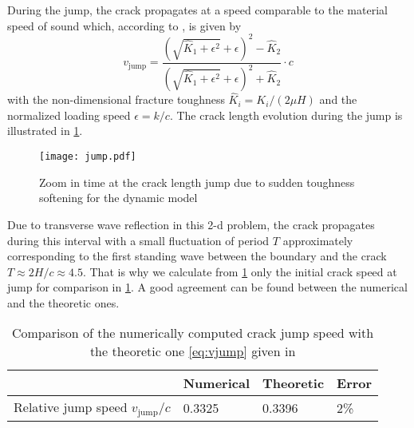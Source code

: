 During the jump, the crack propagates at a speed comparable to the material speed of sound which, according to \cite{DumouchelMarigoCharlotte:2008}, is given by
\begin{equation} \label{eq:vjump}
v_\mathrm{jump}=\frac{\left(\sqrt{\widehat{K}_1+\epsilon^2}+\epsilon\right)^2-\widehat{K}_2}{\left(\sqrt{\widehat{K}_1+\epsilon^2}+\epsilon\right)^2+\widehat{K}_2}\cdot c
\end{equation}
with the non-dimensional fracture toughness $\widehat{K}_i=K_i/(2\mu H)$ and the normalized loading speed $\epsilon=k/c$. The crack length evolution during the jump is illustrated in \cref{fig:softGcqs_jump}.
\begin{figure}[htbp]
\centering
\texttt{[image: jump.pdf]}
\caption{Zoom in time at the crack length jump due to sudden toughness softening for the dynamic model} \label{fig:softGcqs_jump}
\end{figure}
Due to transverse wave reflection in this 2-d problem, the crack propagates during this interval with a small fluctuation of period $T$ approximately corresponding to the first standing wave between the boundary and the crack $T\approx 2H/c\approx 4.5$. That is why we calculate from \cref{fig:softGcqs_jump} only the initial crack speed at jump for comparison in \cref{tab:compjumpv}. A good agreement can be found between the numerical and the theoretic ones.
\begin{table}[htbp]
\centering
\caption{Comparison of the numerically computed crack jump speed with the theoretic one \eqref{eq:vjump} given in \cite{DumouchelMarigoCharlotte:2008}} \label{tab:compjumpv}
\begin{tabular}{llll} \toprule
& Numerical & Theoretic & Error \\ \midrule
Relative jump speed $v_\mathrm{jump}/c$ & 0.3325 & 0.3396 & 2\% \\ \bottomrule
\end{tabular}
\end{table}

